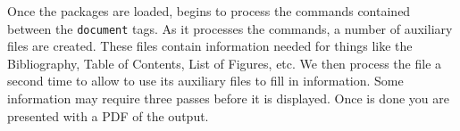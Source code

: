 Once the packages are loaded, \lt begins to process the commands contained between the \texttt{document} tags. As it processes the commands, a number of auxiliary files are created. These files contain information needed for things like the Bibliography, Table of Contents, List of Figures, etc. We then process the file a second time to allow \lt to use its auxiliary files to fill in information. Some information may require three passes before it is displayed. Once \lt is done you are presented with a PDF of the output.

